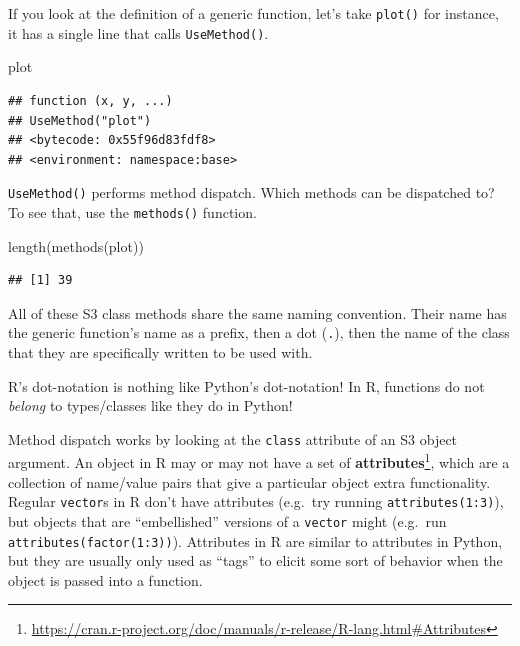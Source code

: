\documentclass[
  12pt,
  krantz2]{krantz}
\makeatletter
\newenvironment{Shaded}{\begin{snugshade}}{\end{snugshade}}
\newcommand{\FunctionTok}[1]{\textcolor[rgb]{0,0,0}{#1}}
\newcommand{\NormalTok}[1]{#1}
\renewcommand{\href}[2]{#2\footnote{\url{#1}}}
\newenvironment{kframe}{%
\medskip{}
\setlength{\fboxsep}{.8em}
 \def\at@end@of@kframe{}%
 \ifinner\ifhmode%
  \def\at@end@of@kframe{\end{minipage}}%
  \begin{minipage}{\columnwidth}%
 \fi\fi%
 \def\FrameCommand##1{\hskip\@totalleftmargin \hskip-\fboxsep
 \colorbox{shadecolor}{##1}\hskip-\fboxsep
     \hskip-\linewidth \hskip-\@totalleftmargin \hskip\columnwidth}%
 \MakeFramed {\advance\hsize-\width
   \@totalleftmargin\z@ \linewidth\hsize
   \@setminipage}}%
 {\par\unskip\endMakeFramed%
 \at@end@of@kframe}
\renewenvironment{Shaded}{\begin{kframe}}{\end{kframe}}
\makeatother
\begin{document}
If you look at the definition of a generic function, let's take \texttt{plot()} for instance, it has a single line that calls \texttt{UseMethod()}.

\begin{Shaded}
\begin{Highlighting}[]
\NormalTok{plot}
\end{Highlighting}
\end{Shaded}

\begin{verbatim}
## function (x, y, ...) 
## UseMethod("plot")
## <bytecode: 0x55f96d83fdf8>
## <environment: namespace:base>
\end{verbatim}

\texttt{UseMethod()} performs method dispatch. Which methods can be dispatched to? To see that, use the \texttt{methods()} function.

\begin{Shaded}
\begin{Highlighting}[]
\FunctionTok{length}\NormalTok{(}\FunctionTok{methods}\NormalTok{(plot))}
\end{Highlighting}
\end{Shaded}

\begin{verbatim}
## [1] 39
\end{verbatim}

All of these S3 class methods share the same naming convention. Their name has the generic function's name as a prefix, then a dot (\texttt{.}), then the name of the class that they are specifically written to be used with.

\begin{rmd-caution}
R's dot-notation is nothing like Python's dot-notation! In R, functions do not \emph{belong} to types/classes like they do in Python!

\end{rmd-caution}

Method dispatch works by looking at the \texttt{class} attribute of an S3 object argument. An object in R may or may not have a set of \href{https://cran.r-project.org/doc/manuals/r-release/R-lang.html\#Attributes}{\textbf{attributes}}, which are a collection of name/value pairs that give a particular object extra functionality. Regular \texttt{vector}s in R don't have attributes (e.g.~try running \texttt{attributes(1:3)}), but objects that are ``embellished'' versions of a \texttt{vector} might (e.g.~run \texttt{attributes(factor(1:3))}). Attributes in R are similar to attributes in Python, but they are usually only used as ``tags'' to elicit some sort of behavior when the object is passed into a function.
\end{document}
